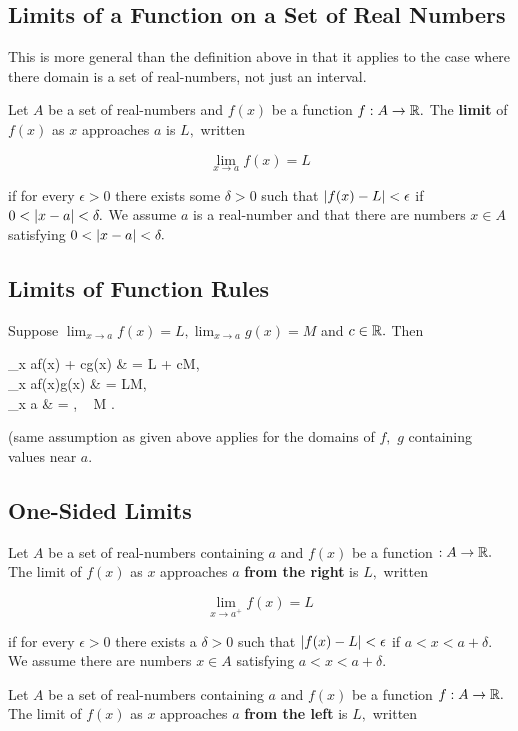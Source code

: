 \documentclass{article}
\begin{document}
\subsection{Limits of a Function on a Set of Real Numbers}

This is more general than the definition above in that it applies to the case where there domain is a set of \@{real-numbers}, not  just an interval.

Let $A$ be a set of \@{real-numbers} and $f(x)$ be a function $f : A \to \mathbb{R}.$ The \textbf{limit} of $f(x)$ as $x$ approaches $a$ is $L,$ written 

\[ \lim_{x \to a}{f(x)} = L \]

if for every $\epsilon > 0$ there exists some $\delta > 0$ such that $\left| f(x) - L \right| < \epsilon$ if $0 < \left| x - a \right| < \delta.$ We assume $a$ is a \@{real-number} and that there are numbers $x \in A$ satisfying $0 < \left| x - a \right| < \delta.$

\subsection{Limits of Function Rules}

Suppose $\lim_{x \to a}{f(x)} = L, \lim_{x \to a}{g(x)} = M$ and $c \in \mathbb{R}.$ Then

\bal \lim_{x \to a}{f(x) + cg(x)} & = L + cM, \\
  \lim_{x \to a}{f(x)g(x)} & = LM, \\
 \lim_{x \to a}{} & = , ~ M . \eal

(same assumption as given above applies for the domains of $f,$ $g$ containing values near $a.$

\subsection{One-Sided Limits}
Let $A$ be a set of \@{real-numbers} containing $a$ and $f(x)$ be a function $ : A \to \mathbb{R}.$ The limit of $f(x)$ as $x$ approaches $a$ \textbf{from the right} is $L,$ written 

\[ \lim_{x \to a^+}{f(x)} = L \]

if for every $\epsilon > 0$ there exists a $\delta > 0$ such that $\left| f(x) - L \right| < \epsilon$ if $a < x < a + \delta.$ We assume there are numbers $x \in A$ satisfying $a < x < a + \delta.$

Let $A$ be a set of \@{real-numbers} containing $a$ and $f(x)$ be a function $f : A \to \mathbb{R}.$ The limit of $f(x)$ as $x$ approaches $a$ \textbf{from the left} is $L,$ written 
\end{document}
